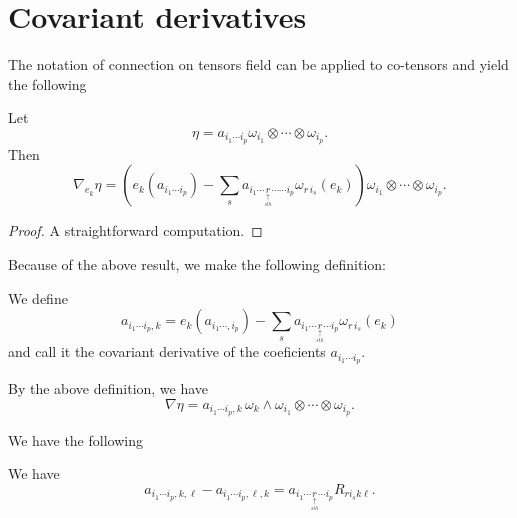 \section{Covariant derivatives}
The notation of connection on tensors field can be applied to co-tensors and yield the following

\begin{lemma} Let
\[
\eta=a_{i_1\cdots i_p}\omega_{i_1}\otimes\cdots\otimes\omega_{i_p}.
\]
Then
\[
\nabla_{e_k}\eta=\left(e_k(a_{i_1\cdots i_p})-\sum_s a_{i_1\cdots \underset{\underset{sth}{\uparrow}}r\cdots\cdots i_p}\omega_{r\, i_s}(e_k)\right)
\omega_{i_1}\otimes\cdots\otimes\omega_{i_p}.
\]
\end{lemma}

\begin{proof} A straightforward computation. \end{proof}





Because of the above result, we make the following definition:

\begin{definition}
We define 
\[
a_{i_1\cdots i_p,k}=e_k(a_{i_1\cdots,i_p})-\sum_s a_{i_1\cdots \underset{\underset{sth}{\uparrow}}r\cdots i_p}\omega_{r\, i_s}(e_k)
\]
and call it the covariant derivative of the coeficients $a_{i_1\cdots i_p}$.
\end{definition}


By the above definition, we have
\[
\nabla \eta=a_{i_1\cdots i_p,k}\,\omega_{k}\wedge \omega_{i_1}\otimes\cdots\otimes\omega_{i_p}.
\]


We have the following

\begin{theorem}\label{thm5} We have
\[
a_{i_1\cdots i_p,k,\ell}-a_{i_1\cdots i_p,\ell,k}
=
a_{i_1\cdots \underset{\underset{sth}{\uparrow}}r\cdots i_p} R_{r i_s k\ell}.
\]
\end{theorem}

